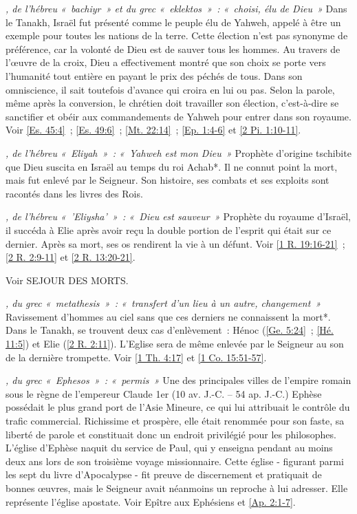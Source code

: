 \begin{multicols}{2}
\textit{, de l'hébreu «~bachiyr~» et du grec «~eklektos~»~: «~choisi, élu de Dieu~»}\newline
Dans le Tanakh, Israël fut présenté comme le peuple élu de Yahweh, appelé à être un exemple pour toutes les nations de la terre. Cette élection n'est pas synonyme de préférence, car la volonté de Dieu est de sauver tous les hommes. Au travers de l'œuvre de la croix, Dieu a effectivement montré que son choix se porte vers l'humanité tout entière en payant le prix des péchés de tous. Dans son omniscience, il sait toutefois d'avance qui croira en lui ou pas. Selon la parole, même après la conversion, le chrétien doit travailler son élection, c'est-à-dire se sanctifier et obéir aux commandements de Yahweh pour entrer dans son royaume. Voir \vref{Es. 45:4}~; \vref{Es. 49:6}~; \vref{Mt. 22:14}~; \vref{Ep. 1:4-6} et \vref{2 Pi. 1:10-11}.

\textit{, de l'hébreu «~Eliyah~»~: «~Yahweh est mon Dieu~»}\newline
Prophète d'origine tschibite que Dieu suscita en Israël au temps du roi Achab*. Il ne connut point la mort, mais fut enlevé par le Seigneur. Son histoire, ses combats et ses exploits sont racontés dans les livres des Rois.

\textit{, de l'hébreu «~'Eliysha'~»~: «~Dieu est sauveur~»}\newline
Prophète du royaume d'Israël, il succéda à Elie après avoir reçu la double portion de l'esprit qui était sur ce dernier. Après sa mort, ses os rendirent la vie à un défunt. Voir \vref{1 R. 19:16-21}~; \vref{2 R. 2:9-11} et \vref{2 R. 13:20-21}.

\textit{}\newline
Voir SEJOUR DES MORTS.

\textit{, du grec «~metathesis~»~: «~transfert d'un lieu à un autre, changement~»}\newline
Ravissement d'hommes au ciel sans que ces derniers ne connaissent la mort*. Dans le Tanakh, se trouvent deux cas d'enlèvement~: Hénoc (\vref{Ge. 5:24}~; \vref{Hé. 11:5}) et Elie (\vref{2 R. 2:11}). L'Eglise sera de même enlevée par le Seigneur au son de la dernière trompette. Voir \vref{1 Th. 4:17} et \vref{1 Co. 15:51-57}.

\textit{, du grec «~Ephesos~»~: «~permis~»}\newline
Une des principales villes de l'empire romain sous le règne de l'empereur Claude 1er (10 av. J.-C. – 54 ap. J.-C.) Ephèse possédait le plus grand port de l'Asie Mineure, ce qui lui attribuait le contrôle du trafic commercial. Richissime et prospère, elle était renommée pour son faste, sa liberté de parole et constituait donc un endroit privilégié pour les philosophes. L'église d'Ephèse naquit du service de Paul, qui y enseigna pendant au moins deux ans lors de son troisième voyage missionnaire. Cette église - figurant parmi les sept du livre d'Apocalypse - fit preuve de discernement et pratiquait de bonnes œuvres, mais le Seigneur avait néanmoins un reproche à lui adresser. Elle représente l'église apostate. Voir Epître aux Ephésiens et \vref{Ap. 2:1-7}.


\end{multicols}

